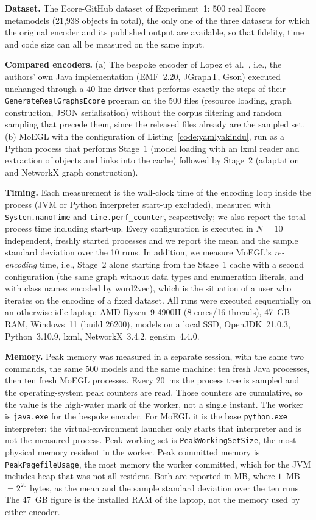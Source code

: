 \documentclass[journal,article,submit,moreauthors,technologies]{Definitions/mdpi}
\newcommand{\rev}[1]{#1}
\begin{document}
\rev{\textbf{Dataset.} The Ecore-GitHub dataset of Experiment~1: 500 real Ecore metamodels (21{,}938 objects in total), the only one of the three datasets for which the original encoder and its published output are available, so that fidelity, time and code size can all be measured on the same input.}

\rev{\textbf{Compared encoders.} (a) The bespoke encoder of Lopez et al.~\cite{lopez2022generating}, i.e., the authors' own Java implementation (EMF~2.20, JGraphT, Gson) executed unchanged through a 40-line driver that performs exactly the steps of their \texttt{GenerateRealGraphsEcore} program on the 500 files (resource loading, graph construction, JSON serialisation) without the corpus filtering and random sampling that precede them, since the released files already are the sampled set. (b) MoEGL with the configuration of Listing~\ref{code:yamlyakindu}, run as a Python process that performs Stage~1 (model loading with an lxml reader and extraction of objects and links into the cache) followed by Stage~2 (adaptation and NetworkX graph construction).}

\rev{\textbf{Timing.} Each measurement is the wall-clock time of the encoding loop inside the process (JVM or Python interpreter start-up excluded), measured with \texttt{System.nanoTime} and \texttt{time.perf\_counter}, respectively; we also report the total process time including start-up. Every configuration is executed in $N=10$ independent, freshly started processes and we report the mean and the sample standard deviation over the 10 runs. In addition, we measure MoEGL's \emph{re-encoding} time, i.e., Stage~2 alone starting from the Stage~1 cache with a second configuration (the same graph without data types and enumeration literals, and with class names encoded by word2vec), which is the situation of a user who iterates on the encoding of a fixed dataset. All runs were executed sequentially on an otherwise idle laptop: AMD Ryzen~9 4900H (8 cores/16 threads), 47~GB RAM, Windows~11 (build 26200), models on a local SSD, OpenJDK~21.0.3, Python~3.10.9, lxml, NetworkX~3.4.2, gensim~4.4.0.}

\rev{\textbf{Memory.} Peak memory was measured in a separate session, with the same two commands, the same 500 models and the same machine: ten fresh Java processes, then ten fresh MoEGL processes. Every 20~ms the process tree is sampled and the operating-system peak counters are read. Those counters are cumulative, so the value is the high-water mark of the worker, not a single instant. The worker is \texttt{java.exe} for the bespoke encoder. For MoEGL it is the base \texttt{python.exe} interpreter; the virtual-environment launcher only starts that interpreter and is not the measured process. Peak working set is \texttt{PeakWorkingSetSize}, the most physical memory resident in the worker. Peak committed memory is \texttt{PeakPagefileUsage}, the most memory the worker committed, which for the JVM includes heap that was not all resident. Both are reported in MB, where $1$~MB $=2^{20}$ bytes, as the mean and the sample standard deviation over the ten runs. The 47~GB figure is the installed RAM of the laptop, not the memory used by either encoder.}
\end{document}

